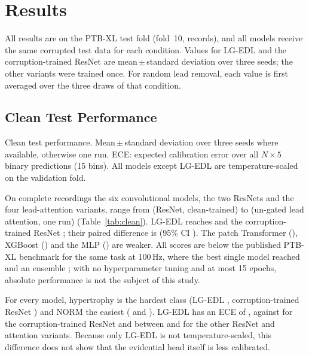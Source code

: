 \section{Results}
\label{sec:results}

All results are on the PTB-XL test fold (fold~10, \nTestRecords{} records), and all models receive the same corrupted
test data for each condition. Values for LG-EDL and the corruption-trained ResNet are mean\,$\pm$\,standard deviation
over three seeds; the other variants were trained once. For random lead removal, each value is first averaged over
the three draws of that condition.

\subsection{Clean Test Performance}
\label{sec:res-clean}

\begin{table}[t]
\centering
\caption{Clean test performance. Mean\,$\pm$\,standard deviation over three seeds where available, otherwise one
run. ECE: expected calibration error over all $N\times5$ binary predictions (15 bins). All models except LG-EDL are
temperature-scaled on the validation fold.}
\label{tab:clean}
\begin{adjustbox}{max width=\columnwidth}\end{adjustbox}
\end{table}

On complete recordings the six convolutional models, the two ResNets and the four lead-attention variants, range
from \aucResCleanClean{} (ResNet, clean-trained) to \aucResAttnClean{} (un-gated lead attention, one run)
(Table~\ref{tab:clean}). LG-EDL reaches \aucLgEdlCleanPM{} and the corruption-trained ResNet \aucResDropCleanPM; their
paired difference is \bootCleanDiff{} (95\% CI \bootCleanCI). The patch Transformer (\aucTransClean), XGBoost
(\aucXgbClean) and the MLP (\aucMlpClean) are weaker. All scores are below the published PTB-XL benchmark for the
same task at 100\,Hz, where the best single model reached \litBestSingleAuc{} and an ensemble \litEnsembleAuc{}
\cite{strodthoff2021benchmark}; with no hyperparameter tuning and at most 15 epochs, absolute performance is not
the subject of this study.

For every model, hypertrophy is the hardest class (LG-EDL \pcLgEdlHyp, corruption-trained ResNet \pcResDropHyp) and
NORM the easiest (\pcLgEdlNorm{} and \pcResDropNorm). LG-EDL has an ECE of \eceLgEdlCleanPM, against
\eceResDropCleanPM{} for the corruption-trained ResNet and between \eceResCleanClean{} and \eceResAttnClean{} for the
other ResNet and attention variants. Because only LG-EDL is not temperature-scaled, this difference does not show
that the evidential head itself is less calibrated.

